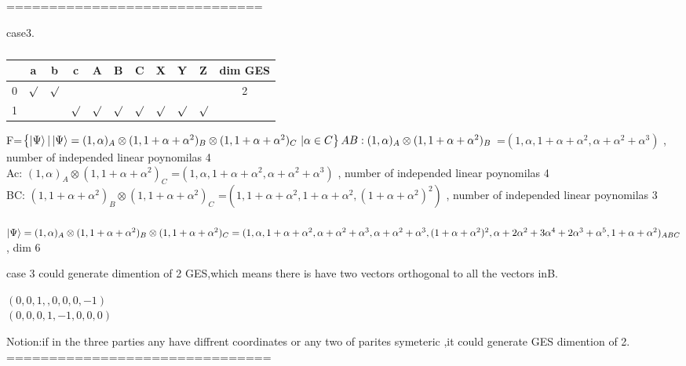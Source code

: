 \documentclass[12pt,twoside]{report}
\begin{document}
 
 
  ==============================
 
 
 
  case3.
  
  
   \begin{table}[ht]
  	\centering
  	\begin{tabular}{|c|c|c|c|c|c|c|c|c|c|c|}
  		\hline
  		& a & b  &  c & A & B & C & X & Y & Z & dim GES  \\
  		\hline
  		0	& $\surd$& $\surd$ & & & & & & &  & 2\\
  		\hline
  		1 &	& &$\surd$ & $\surd$&$\surd$ &$\surd$ &$\surd$ &$\surd$ & $\surd$ &\\
  		\hline 		
  	\end{tabular}
  	\caption{}
  \end{table}
  
    
  F=$ \left\lbrace {\Ket{\Psi}|\ket{\Psi}=(1,\alpha)_{A}\otimes(1,1+\alpha+\alpha^{2})_{B}\otimes(1,1+\alpha+\alpha^{2})_{C}}  \ |\alpha\in C\right\rbrace  
  \\
  AB:  (1,\alpha)_{A}\otimes(1,1+\alpha+\alpha^{2})_{B}$ =$ (1,\alpha,1+\alpha+\alpha^{2},\alpha+\alpha^{2}+\alpha^{3})$  ,  number of independed linear poynomilas  4  \\
  Ac:  $(1,\alpha)_{A}\otimes(1,1+\alpha+\alpha^{2})_{C}$ =$ (1,\alpha,1+\alpha+\alpha^{2},\alpha+\alpha^{2}+\alpha^{3})$  ,  number of independed linear poynomilas  4  \\
  BC:  $(1,1+\alpha+\alpha^{2})_{B} \otimes(1,1+\alpha+\alpha^{2})_{C}$ =$ (1,1+\alpha+\alpha^{2},1+\alpha+\alpha^{2},(1+\alpha+\alpha^{2})^{2})$  ,  number of independed linear poynomilas  3  \\
  \\
  $ {\ket{\Psi}=(1,\alpha)_{A}\otimes(1,1+\alpha+\alpha^{2})_{B}\otimes(1,1+\alpha+\alpha^{2})_{C}} =(1,\alpha,1+\alpha+\alpha^{2},\alpha+\alpha^{2}+\alpha^{3},\alpha+\alpha^{2}+\alpha^{3},(1+\alpha+\alpha^{2})^{2},\alpha+2\alpha^{2}+3\alpha^{4}+2\alpha^{3}+\alpha^{5},1+\alpha+\alpha^{2})_{ABC}$   , dim 6
  
   case 3 could generate  dimention of 2 GES,which means there is have two vectors orthogonal to all the vectors inB.\\
  \begin{center}
  	$ (0,0,1,,0,0,0,-1) $\\
  	$ (0,0,0,1,-1,0,0,0) $
  \end{center}
	Notion:if in the three parties any have diffrent coordinates or any two of parites symeteric ,it could generate GES dimention of 2.\\
	===============================
	  
\end{document}
